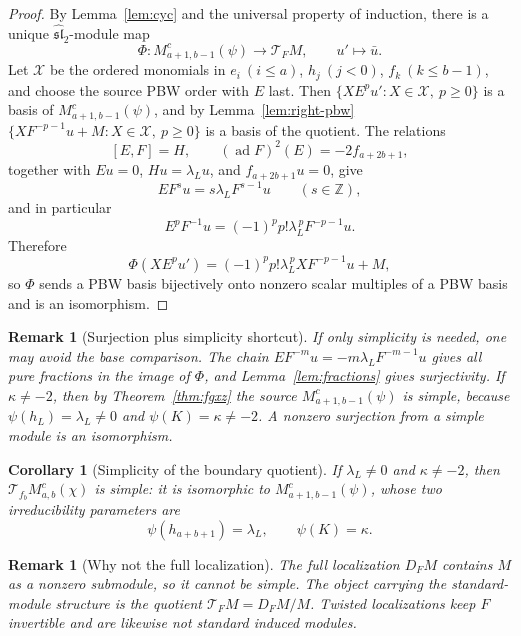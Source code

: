 \documentclass[11pt,a4paper]{article}
\newcommand{\Z}{\mathbb Z}
\newcommand{\slh}{\widehat{\mathfrak{sl}}_2}
\newcommand{\ad}{\operatorname{ad}}
\newcommand{\X}{\mathcal X}
\newcommand{\T}{\mathcal T}
\theoremstyle{plainupright}
\newtheorem{corollary}[proposition]{Corollary}
\newtheorem{remark}[proposition]{Remark}
\begin{document}
\begin{proof}
By Lemma~\ref{lem:cyc} and the universal property of induction, there is a
unique \(\slh\)-module map
\[
\Phi:M^c_{a+1,b-1}(\psi)\longrightarrow\T_FM,
\qquad u'\longmapsto\bar u.
\]
Let \(\X\) be the ordered monomials in \(e_i\ (i\le a)\), \(h_j\ (j<0)\),
\(f_k\ (k\le b-1)\), and choose the source PBW order with \(E\) last. Then
\(\{XE^pu':X\in\X,\ p\ge0\}\) is a basis of \(M^c_{a+1,b-1}(\psi)\), and by
Lemma~\ref{lem:right-pbw}
\(\{XF^{-p-1}u+M:X\in\X,\ p\ge0\}\) is a basis of the quotient. The relations
\[
[E,F]=H,\qquad (\ad F)^2(E)=-2f_{a+2b+1},
\]
together with \(Eu=0\), \(Hu=\lambda_Lu\), and \(f_{a+2b+1}u=0\), give
\[
EF^su=s\lambda_LF^{s-1}u\qquad(s\in\Z),
\]
and in particular
\[
E^pF^{-1}u=(-1)^pp!\lambda_L^{\,p}F^{-p-1}u.
\]
Therefore
\[
\Phi(XE^pu')=(-1)^pp!\lambda_L^{\,p}XF^{-p-1}u+M,
\]
so \(\Phi\) sends a PBW basis bijectively onto nonzero scalar multiples of a
PBW basis and is an isomorphism.
\end{proof}

\begin{remark}[Surjection plus simplicity shortcut]\label{rem:shortcut}
If only simplicity is needed, one may avoid the base comparison. The chain
\(EF^{-m}u=-m\lambda_LF^{-m-1}u\) gives all pure fractions in the image of
\(\Phi\), and Lemma~\ref{lem:fractions} gives surjectivity. If \(\kappa\ne-2\),
then by Theorem~\ref{thm:fgxz} the source \(M^c_{a+1,b-1}(\psi)\) is simple,
because \(\psi(h_L)=\lambda_L\ne0\) and \(\psi(K)=\kappa\ne-2\). A nonzero
surjection from a simple module is an isomorphism.
\end{remark}

\begin{corollary}[Simplicity of the boundary quotient]\label{cor:simple}
If \(\lambda_L\ne0\) and \(\kappa\ne-2\), then \(\T_{f_b}M^c_{a,b}(\chi)\) is
simple: it is isomorphic to \(M^c_{a+1,b-1}(\psi)\), whose two irreducibility
parameters are
\[
\psi(h_{a+b+1})=\lambda_L,\qquad \psi(K)=\kappa.
\]
\end{corollary}

\begin{remark}[Why not the full localization]\label{rem:full}
The full localization \(D_FM\) contains \(M\) as a nonzero submodule, so it
cannot be simple. The object carrying the standard-module structure is the
quotient \(\T_FM=D_FM/M\). Twisted localizations keep \(F\) invertible and
are likewise not standard induced modules.
\end{remark}
\end{document}
